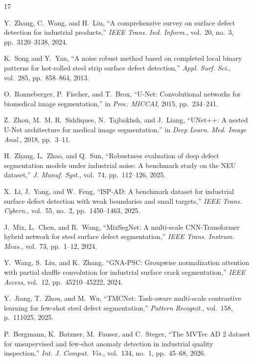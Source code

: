 \documentclass[10pt,a4paper]{article}
\renewenvironment{thebibliography}[1]{
  \begin{oldthebibliography}{#1}
    \fontsize{7.8pt}{9.1pt}\selectfont
    \setlength{\itemsep}{0.0pt}
    \setlength{\parskip}{0pt}
}{\end{oldthebibliography}}
\begin{document}
\begin{thebibliography}{17}
Y.~Zhang, C.~Wang, and H.~Liu, ``A comprehensive survey on surface defect detection for industrial products,'' \emph{IEEE Trans. Ind. Inform.}, vol.~20, no.~3, pp.~3120--3138, 2024.

K.~Song and Y.~Yan, ``A noise robust method based on completed local binary patterns for hot-rolled steel strip surface defect detection,'' \emph{Appl. Surf. Sci.}, vol.~285, pp.~858--864, 2013.

O.~Ronneberger, P.~Fischer, and T.~Brox, ``U-Net: Convolutional networks for biomedical image segmentation,'' in \emph{Proc. MICCAI}, 2015, pp.~234--241.

Z.~Zhou, M.~M. R.~Siddiquee, N.~Tajbakhsh, and J.~Liang, ``UNet++: A nested U-Net architecture for medical image segmentation,'' in \emph{Deep Learn. Med. Image Anal.}, 2018, pp.~3--11.

H.~Zhang, L.~Zhao, and Q.~Sun, ``Robustness evaluation of deep defect segmentation models under industrial noise: A benchmark study on the NEU dataset,'' \emph{J. Manuf. Syst.}, vol.~74, pp.~112--126, 2025.

X.~Li, J.~Yang, and W.~Feng, ``ISP-AD: A benchmark dataset for industrial surface defect detection with weak boundaries and small targets,'' \emph{IEEE Trans. Cybern.}, vol.~55, no.~2, pp.~1450--1463, 2025.

J.~Mix, L.~Chen, and R.~Wang, ``MixSegNet: A multi-scale CNN-Transformer hybrid network for steel surface defect segmentation,'' \emph{IEEE Trans. Instrum. Meas.}, vol.~73, pp.~1--12, 2024.

Y.~Wang, S.~Liu, and K.~Zhang, ``GNA-PSC: Groupwise normalization attention with partial shuffle convolution for industrial surface crack segmentation,'' \emph{IEEE Access}, vol.~12, pp.~45210--45222, 2024.

Y.~Jiang, T.~Zhou, and M.~Wu, ``TMCNet: Task-aware multi-scale contrastive learning for few-shot steel defect segmentation,'' \emph{Pattern Recognit.}, vol.~158, p.~111025, 2025.

P.~Bergmann, K.~Batzner, M.~Fauser, and C.~Steger, ``The MVTec AD 2 dataset for unsupervised and few-shot anomaly detection in industrial quality inspection,'' \emph{Int. J. Comput. Vis.}, vol.~134, no.~1, pp.~45--68, 2026.


\end{thebibliography}
\end{document}

